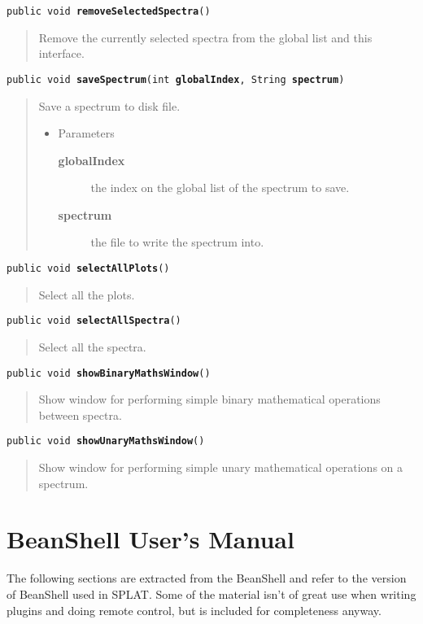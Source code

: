 \documentclass[twoside,11pt,nolof]{starlink}
\providecommand{\SPLAT}{\textsf{SPLAT}}
\providecommand{\method}[1]{\texttt{#1}}
\newenvironment{desc}{\begin{quote}}{\end{quote}}
\begin{document}
\method{public void \textbf{removeSelectedSpectra}()\label{l370}\label{l371}}
\begin{desc}Remove the currently selected spectra from the global list and
 this interface.
\end{desc}

\method{public void \textbf{saveSpectrum}(\texttt{int} \textbf{globalIndex}, \texttt{String} \textbf{spectrum})\label{l372}\label{l373}}
\begin{desc}Save a spectrum to disk file.
\begin{itemize}
\item{Parameters
  \begin{description}
   \item[\textbf{globalIndex}]{the index on the global list of the spectrum
                    to save.}
   \item[\textbf{spectrum}]{the file to write the spectrum into.}
  \end{description}}
\end{itemize}
\end{desc}

\method{public void \textbf{selectAllPlots}()\label{l374}\label{l375}}
\begin{desc}Select all the plots.
\end{desc}

\method{public void \textbf{selectAllSpectra}()\label{l376}\label{l377}}
\begin{desc}Select all the spectra.
\end{desc}

\method{public void \textbf{showBinaryMathsWindow}()\label{l378}\label{l379}}
\begin{desc}Show window for performing simple binary mathematical
 operations between spectra.
\end{desc}

\method{public void \textbf{showUnaryMathsWindow}()\label{l380}\label{l381}}
\begin{desc}Show window for performing simple unary mathematical
 operations on a spectrum.
\end{desc}

\section{\label{beanshell_appendix}BeanShell User's Manual}

The following sections are extracted from the BeanShell
 and
refer to the version of BeanShell used in \SPLAT. Some of the material
isn't of great use when writing plugins and doing remote control, but
is included for completeness anyway.
\end{document}
